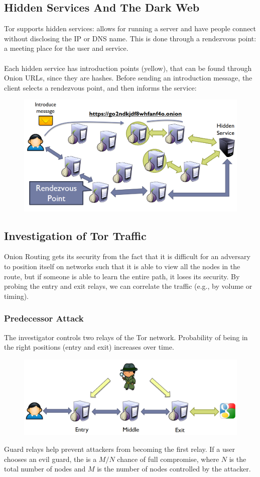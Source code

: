 \documentclass[10pt,a4paper]{report}
\begin{document}
\subsection{Hidden Services And The Dark Web}
Tor supports hidden services: allows for running a server and have people connect without disclosing the IP or DNS name. This is done through a rendezvous point: a meeting place for the user and service.\\
\\
Each hidden service has introduction points (yellow), that can be found through Onion URLs, since they are hashes. Before sending an introduction message, the client selects a rendezvous point, and then informs the service:
\begin{figure}[H]
\centering
\includegraphics[scale=0.5]{29.png}
\end{figure}
\subsection{Investigation of Tor Traffic}
Onion Routing gets its security from the fact that it is difficult for an adversary to position itself on networks such that it is able to view all the nodes in the route, but if someone is able to learn the entire path, it loses its security. By probing the entry and exit relays, we can correlate
the traffic (e.g., by volume or timing).
\subsubsection{Predecessor Attack}
The investigator controls two relays of the Tor network. Probability of being in the right positions (entry and exit) increases over time.
\begin{figure}[H]
\centering
\includegraphics[scale=0.3]{22.png}
\end{figure}
Guard relays help prevent attackers from becoming the first relay. If a user chooses an evil guard, the is a $M/N$ chance of full compromise, where $N$ is the total number of nodes and $M$ is the number of nodes controlled by the attacker.
\end{document}
